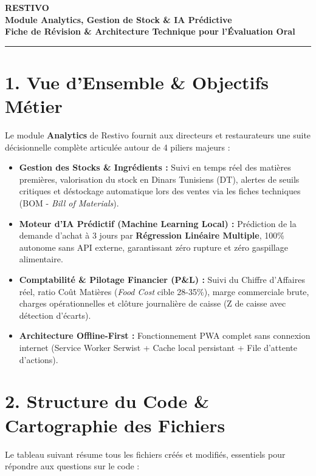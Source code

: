 \documentclass[10pt,a4paper]{article}
\begin{document}
\begin{center}
    {\Huge \textbf{\textcolor{restivored}{RESTIVO}}}\\[4pt]
    {\Large \textbf{\textcolor{restivodark}{Module Analytics, Gestion de Stock \& IA Prédictive}}}\\[2pt]
    {\normalsize \textcolor{restivogray}{\textbf{Fiche de Révision \& Architecture Technique pour l'Évaluation Oral}}}
\end{center}
\vspace{-8pt}
\noindent\textcolor{restivored}{\rule{\textwidth}{1.5pt}}
\vspace{4pt}

\section*{\textcolor{restivored}{1. Vue d'Ensemble \& Objectifs Métier}}
Le module \textbf{Analytics} de Restivo fournit aux directeurs et restaurateurs une suite décisionnelle complète articulée autour de 4 piliers majeurs :
\begin{itemize}[leftmargin=*,itemsep=1pt]
    \item \textbf{Gestion des Stocks \& Ingrédients :} Suivi en temps réel des matières premières, valorisation du stock en Dinars Tunisiens (DT), alertes de seuils critiques et déstockage automatique lors des ventes via les fiches techniques (BOM - \textit{Bill of Materials}).
    \item \textbf{Moteur d'IA Prédictif (Machine Learning Local) :} Prédiction de la demande d'achat à 3 jours par \textbf{Régression Linéaire Multiple}, 100\% autonome sans API externe, garantissant zéro rupture et zéro gaspillage alimentaire.
    \item \textbf{Comptabilité \& Pilotage Financier (P\&L) :} Suivi du Chiffre d'Affaires réel, ratio Coût Matières (\textit{Food Cost} cible 28-35\%), marge commerciale brute, charges opérationnelles et clôture journalière de caisse (Z de caisse avec détection d'écarts).
    \item \textbf{Architecture Offline-First :} Fonctionnement PWA complet sans connexion internet (Service Worker Serwist + Cache local persistant + File d'attente d'actions).
\end{itemize}

\section*{\textcolor{restivored}{2. Structure du Code \& Cartographie des Fichiers}}
Le tableau suivant résume tous les fichiers créés et modifiés, essentiels pour répondre aux questions sur le code :
\end{document}
